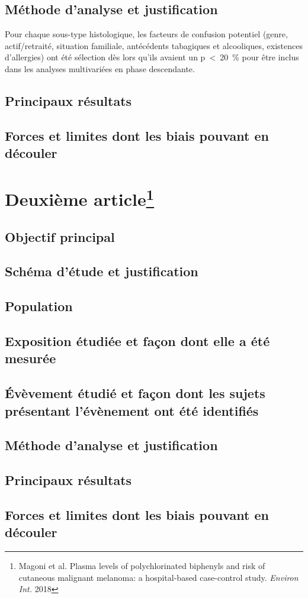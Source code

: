 \documentclass[10pt]{article}
\begin{document}
\subsection{Méthode d'analyse et justification}
Pour chaque sous-type histologique, les facteurs de confusion potentiel (genre, actif/retraité, situation familiale, antécédents tabagiques et alcooliques, existences d'allergies) ont été sélection dès lors qu'ils avaient un p~<~20~\% pour être inclus dans les analyses multivariées en phase descendante. 

\subsection{Principaux résultats}

\subsection{Forces et limites dont les biais pouvant en découler}

\newpage
\section{Deuxième article\protect\footnote{Magoni et al. Plasma levels of polychlorinated biphenyls and risk of cutaneous malignant melanoma: a hospital-based case-control study. \emph{Environ Int.} 2018}}
\subsection{Objectif principal}

\subsection{Schéma d'étude et justification}

\subsection{Population}

\subsection{Exposition étudiée et façon dont elle a été mesurée}

\subsection{\'{E}vèvement étudié et façon dont les sujets présentant l'évènement ont été identifiés}

\subsection{Méthode d'analyse et justification}

\subsection{Principaux résultats}

\subsection{Forces et limites dont les biais pouvant en découler}
\end{document}
